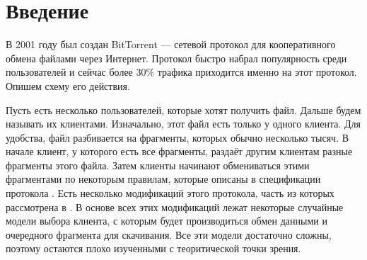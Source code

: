 \documentclass{matmex-diploma-custom}
\theoremstyle{named}
\begin{document}
\maketitle
	
\renewcommand{\contentsname}{Оглавление}
\tableofcontents
\newpage

\section*{Введение}
В 2001 году был создан BitTorrent --- сетевой протокол для кооперативного обмена файлами через Интернет.
Протокол быстро набрал популярность среди пользователей и сейчас более 30\% трафика приходится именно на этот протокол.
Опишем схему его действия.

Пусть есть несколько пользователей, которые хотят получить файл. Дальше будем называть их клиентами.
Изначально, этот файл есть только у одного клиента. 
Для удобства, файл разбивается на фрагменты, которых обычно несколько тысяч.
В начале клиент, у которого есть все фрагменты, раздаёт другим клиентам разные фрагменты этого файла.
Затем клиенты начинают обмениваться этими фрагментами по некоторым правилам, 
которые описаны в спецификации протокола \cite{spec}.
Есть несколько модификаций этого протокола, часть из которых рассмотрена в \cite{cool}.
В основе всех этих модификаций лежат некоторые случайные модели выбора клиента, 
с которым будет производиться обмен данными и очередного фрагмента для скачивания. 
Все эти модели достаточно сложны, поэтому остаются плохо изученными с теоритической точки зрения.
\end{document}
